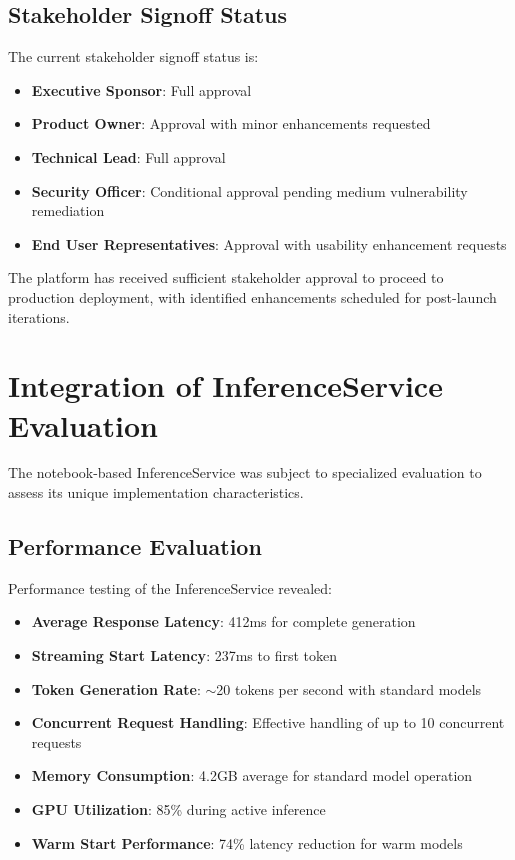 \subsection{Stakeholder Signoff Status}

The current stakeholder signoff status is:

\begin{itemize}
    \item \textbf{Executive Sponsor}: Full approval
    \item \textbf{Product Owner}: Approval with minor enhancements requested
    \item \textbf{Technical Lead}: Full approval
    \item \textbf{Security Officer}: Conditional approval pending medium vulnerability remediation
    \item \textbf{End User Representatives}: Approval with usability enhancement requests
\end{itemize}

The platform has received sufficient stakeholder approval to proceed to production deployment, with identified enhancements scheduled for post-launch iterations.

\section{Integration of InferenceService Evaluation}

The notebook-based InferenceService was subject to specialized evaluation to assess its unique implementation characteristics.

\subsection{Performance Evaluation}

Performance testing of the InferenceService revealed:

\begin{itemize}
    \item \textbf{Average Response Latency}: 412ms for complete generation
    \item \textbf{Streaming Start Latency}: 237ms to first token
    \item \textbf{Token Generation Rate}: $\sim$20 tokens per second with standard models
    \item \textbf{Concurrent Request Handling}: Effective handling of up to 10 concurrent requests
    \item \textbf{Memory Consumption}: 4.2GB average for standard model operation
    \item \textbf{GPU Utilization}: 85\% during active inference
    \item \textbf{Warm Start Performance}: 74\% latency reduction for warm models
\end{itemize}

